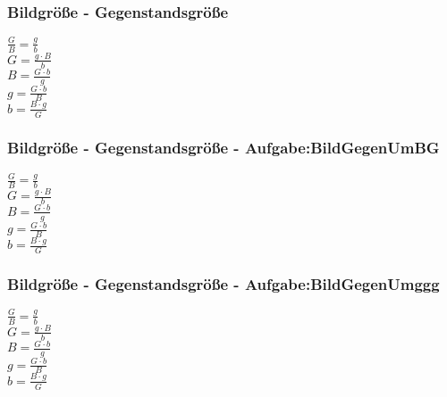 \subsubsection{Bildgröße - Gegenstandsgröße} 
\begin{minipage}{0.45\textwidth} 
$ \frac{G}{B} = \frac{g}{b} $\\ 
$ G = \frac{g\cdot B}{ b} $\\ 
$ B = \frac{G\cdot b}{ g} $\\ 
$ g = \frac{G\cdot b}{ B} $\\ 
$ b = \frac{B\cdot g}{ G} $\\ 
\end{minipage} 
\begin{minipage}{0.45\textwidth} 
 
\end{minipage} 
\subsubsection{Bildgröße - Gegenstandsgröße - Aufgabe:BildGegenUmBG} 
\begin{minipage}{0.45\textwidth} 
$ \frac{G}{B} = \frac{g}{b} $\\ 
$ G = \frac{g\cdot B}{ b} $\\ 
$ B = \frac{G\cdot b}{ g} $\\ 
$ g = \frac{G\cdot b}{ B} $\\ 
$ b = \frac{B\cdot g}{ G} $\\ 
\end{minipage} 
\begin{minipage}{0.45\textwidth} 
 
\end{minipage} 
\subsubsection{Bildgröße - Gegenstandsgröße - Aufgabe:BildGegenUmggg} 
\begin{minipage}{0.45\textwidth} 
$ \frac{G}{B} = \frac{g}{b} $\\ 
$ G = \frac{g\cdot B}{ b} $\\ 
$ B = \frac{G\cdot b}{ g} $\\ 
$ g = \frac{G\cdot b}{ B} $\\ 
$ b = \frac{B\cdot g}{ G} $\\ 
\end{minipage} 
\begin{minipage}{0.45\textwidth} 
 
\end{minipage} 

